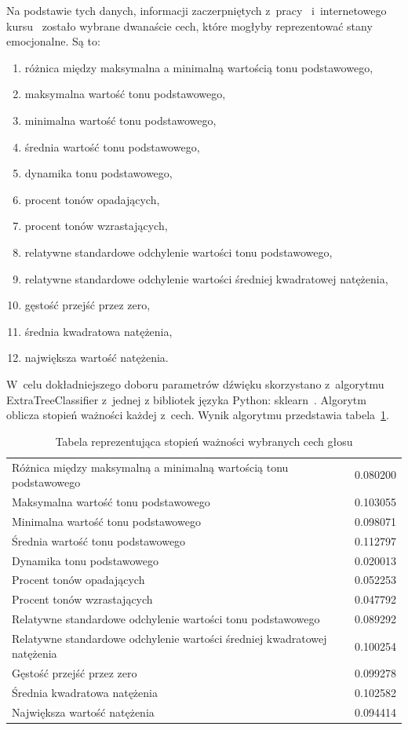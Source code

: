 \documentclass[declaration,shortabstract]{iithesis}
\begin{document}
Na podstawie tych danych, informacji zaczerpniętych z~pracy~\cite{Akustyka} i~internetowego kursu~\cite{Waveform} zostało wybrane dwanaście cech, które mogłyby reprezentować stany emocjonalne.
Są to: 
\begin{enumerate}
\item różnica między maksymalna a minimalną wartością tonu podstawowego,
\item maksymalna wartość tonu podstawowego,
\item minimalna wartość tonu podstawowego,
\item średnia wartość tonu podstawowego,
\item dynamika tonu podstawowego,
\item procent tonów opadających,
\item procent tonów wzrastających,
\item relatywne standardowe odchylenie wartości tonu podstawowego,
\item relatywne standardowe odchylenie wartości średniej kwadratowej natężenia,
\item gęstość przejść przez zero,
\item średnia kwadratowa natężenia,
\item największa wartość natężenia.
\end{enumerate}

W~celu dokładniejszego doboru parametrów dźwięku skorzystano z~algorytmu ExtraTreeClassifier z~jednej z bibliotek języka Python: sklearn~\cite{sklearn}. Algorytm oblicza stopień ważności każdej z~cech. Wynik algorytmu przedstawia tabela~\ref{TWaznosc_cech}.

\begin{table}[H]
\caption{Tabela reprezentująca stopień ważności wybranych cech głosu}
\begin{tabular}{ l | r }
\label{TWaznosc_cech}
Różnica między maksymalną a minimalną wartością tonu podstawowego & 0.080200 \\
Maksymalna wartość tonu podstawowego & 0.103055 \\
Minimalna wartość tonu podstawowego & 0.098071 \\
Średnia wartość tonu podstawowego & 0.112797 \\
Dynamika tonu podstawowego & 0.020013 \\
Procent tonów opadających & 0.052253 \\
Procent tonów wzrastających & 0.047792 \\
Relatywne standardowe odchylenie wartości tonu podstawowego & 0.089292 \\
Relatywne standardowe odchylenie wartości średniej kwadratowej natężenia & 0.100254 \\
Gęstość przejść przez zero & 0.099278 \\
Średnia kwadratowa natężenia & 0.102582 \\
Największa wartość natężenia & 0.094414 \\
\end{tabular}
\end{table}
\end{document}

